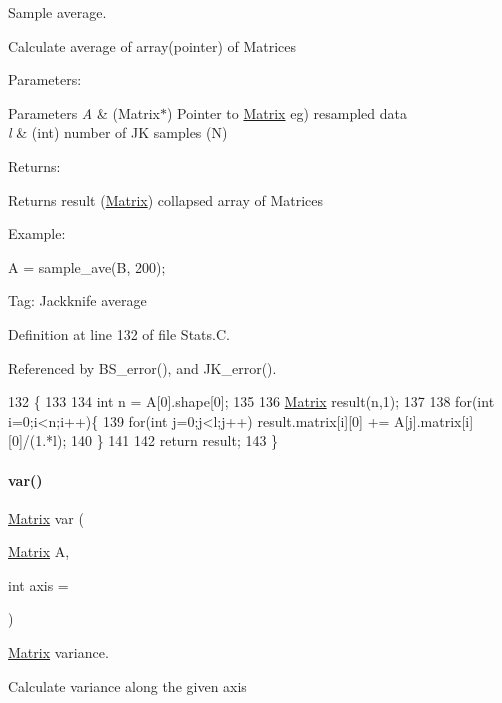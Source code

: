 Sample average. 

Calculate average of array(pointer) of Matrices

Parameters\+: 
\begin{DoxyParams}{Parameters}
{\em A} & (Matrix$\ast$) Pointer to \hyperlink{classMatrix}{Matrix} eg) resampled data \\
\hline
{\em l} & (int) number of JK samples (N)\\
\hline
\end{DoxyParams}
Returns\+: \begin{DoxyReturn}{Returns}
result (\hyperlink{classMatrix}{Matrix}) collapsed array of Matrices
\end{DoxyReturn}
Example\+:

A = sample\+\_\+ave(\+B, 200);

Tag\+: Jackknife average 

Definition at line 132 of file Stats.\+C.



Referenced by B\+S\+\_\+error(), and J\+K\+\_\+error().


\begin{DoxyCode}
132                                    \{
133 
134   \textcolor{keywordtype}{int} n = A[0].shape[0];
135 
136   \hyperlink{classMatrix}{Matrix} result(n,1);
137 
138   \textcolor{keywordflow}{for}(\textcolor{keywordtype}{int} i=0;i<n;i++)\{
139     \textcolor{keywordflow}{for}(\textcolor{keywordtype}{int} j=0;j<l;j++) result.matrix[i][0] += A[j].matrix[i][0]/(1.*l);
140   \}
141 
142   \textcolor{keywordflow}{return} result;
143 \}
\end{DoxyCode}
\mbox{\label{Stats_8C_a2e68f0f11b60ca80c496e3afb4b7cc01}} 
\paragraph{\texorpdfstring{var()}{var()}}
{\footnotesize\ttfamily \hyperlink{classMatrix}{Matrix} var (\begin{DoxyParamCaption}\item[{\hyperlink{classMatrix}{Matrix}}]{A,  }\item[{int}]{axis = {} }\end{DoxyParamCaption})}



\hyperlink{classMatrix}{Matrix} variance. 

Calculate variance along the given axis

